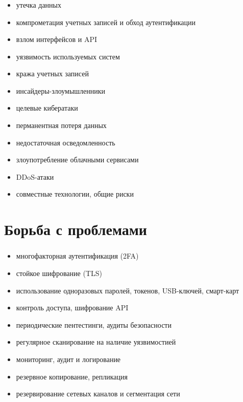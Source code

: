\begin{frame}
\frametitle{\insertsection}

\begin{itemize}
    \item утечка данных
    \item компрометация учетных записей и обход аутентификации
    \item взлом интерфейсов и API
    \item уязвимость используемых систем
    \item кража учетных записей
    \item инсайдеры-злоумышленники
    \item целевые кибератаки
    \item перманентная потеря данных
    \item недостаточная осведомленность
    \item злоупотребление облачными сервисами
    \item DDoS-атаки
    \item совместные технологии, общие риски
\end{itemize}
\end{frame}


\section{Борьба с проблемами}

\begin{frame}
\frametitle{\insertsection}

\begin{itemize}
    \item многофакторная аутентификация (2FA)
    \item стойкое шифрование (TLS)
    \item использование одноразовых паролей, токенов, USB-ключей, смарт-карт
    \item контроль доступа, шифрование API
    \item периодические пентестинги, аудиты безопасности
    \item регулярное сканирование на наличие уязвимостией
    \item мониторинг, аудит и логирование
    \item резервное копирование, репликация
    \item резервирование сетевых каналов и сегментация сети
\end{itemize}
\end{frame}

